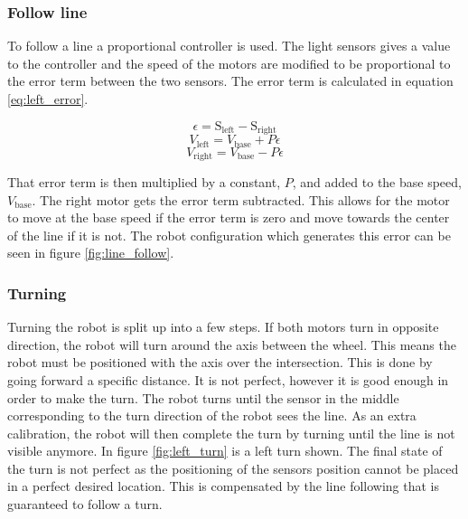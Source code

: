 \subsubsection{Follow line}

To follow a line a proportional controller is used.
The light sensors gives a value to the controller and the speed of the motors are modified to be proportional to the error term between the two sensors.
The error term is calculated in equation \ref{eq:left_error}.

\begin{equation}
  \epsilon = \text{S}_{\text{left}} - \text{S}_{\text{right}}
 \label{eq:left_error}
\end{equation}
\begin{equation}
  V_\text{left} = V_\text{base} + P \epsilon
 \label{eq:left_speed}
\end{equation}
\begin{equation}
  V_\text{right} = V_\text{base} - P \epsilon
 \label{eq:right_speed}
\end{equation}

That error term is then multiplied by a constant, $P$, and added to the base speed, $V_\text{base}$.
The right motor gets the error term subtracted.
This allows for the motor to move at the base speed if the error term is zero and move towards the center of the line if it is not.
The robot configuration which generates this error can be seen in figure \ref{fig:line_follow}.

\subsubsection{Turning}
Turning the robot is split up into a few steps.
If both motors turn in opposite direction, the robot will turn around the axis between the wheel.
This means the robot must be positioned with the axis over the intersection.
This is done by going forward a specific distance.
It is not perfect, however it is good enough in order to make the turn.
The robot turns until the sensor in the middle corresponding to the turn direction of the robot sees the line.
As an extra calibration, the robot will then complete the turn by turning until the line is not visible anymore.
In figure \ref{fig:left_turn} is a left turn shown.
The final state of the turn is not perfect as the positioning of the sensors position cannot be placed in a perfect desired location.
This is compensated by the line following that is guaranteed to follow a turn.

